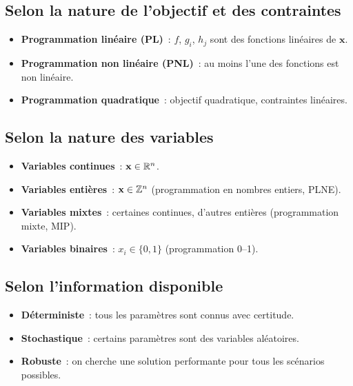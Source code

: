 \subsection{Selon la nature de l'objectif et des contraintes}

\begin{itemize}
  \item \textbf{Programmation lin\'eaire (PL)}~: $f$, $g_i$, $h_j$ sont des
        fonctions lin\'eaires de $\mathbf{x}$.
  \item \textbf{Programmation non lin\'eaire (PNL)}~: au moins l'une des
        fonctions est non lin\'eaire.
  \item \textbf{Programmation quadratique}~: objectif quadratique,
        contraintes lin\'eaires.
\end{itemize}

\subsection{Selon la nature des variables}

\begin{itemize}
  \item \textbf{Variables continues}~: $\mathbf{x} \in \mathbb{R}^n$.
  \item \textbf{Variables enti\`eres}~: $\mathbf{x} \in \mathbb{Z}^n$
        (programmation en nombres entiers, PLNE).
  \item \textbf{Variables mixtes}~: certaines continues, d'autres enti\`eres
        (programmation mixte, MIP).
  \item \textbf{Variables binaires}~: $x_i \in \{0, 1\}$
        (programmation 0--1).
\end{itemize}

\subsection{Selon l'information disponible}

\begin{itemize}
  \item \textbf{D\'eterministe}~: tous les param\`etres sont connus avec
        certitude.
  \item \textbf{Stochastique}~: certains param\`etres sont des variables
        al\'eatoires.
  \item \textbf{Robuste}~: on cherche une solution performante pour tous
        les sc\'enarios possibles.
\end{itemize}

